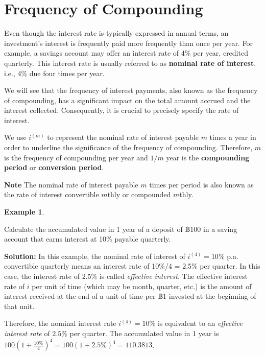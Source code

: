 \documentclass[
]{book}
\theoremstyle{definition}
\theoremstyle{definition}
\newtheorem{example}{Example}[chapter]
\theoremstyle{definition}
\theoremstyle{definition}
\theoremstyle{remark}
\begin{document}
\hypertarget{frequency-of-compounding}{%
\section{Frequency of Compounding}\label{frequency-of-compounding}}

Even though the interest rate is typically expressed in annual terms, an investment's interest is frequently paid more frequently than once per year. For example, a savings account may offer an interest rate of 4\% per year, credited quarterly. This interest rate is usually referred to as \textbf{nominal rate of interest}, i.e., 4\% due four times per year.

We will see that the frequency of interest payments, also known as the frequency of compounding, has a significant impact on the total amount accrued and the interest collected. Consequently, it is crucial to precisely specify the rate of interest.

We use \(i^{(m)}\) to represent the nominal rate of interest payable \(m\) times a year in order to underline the significance of the frequency of compounding. Therefore, \(m\) is the
frequency of compounding per year and \(1/m\) year is the \textbf{compounding period} or \textbf{conversion period}.

\textbf{Note} The nominal rate of interest payable \(m\) times per period is also known as the rate of interest convertible \(m\)thly or compounded \(m\)thly.

\begin{example}
\protect\hypertarget{exm:unlabeled-div-5}{}\label{exm:unlabeled-div-5}

Calculate the accumulated value in 1 year of a deposit of ฿100 in a saving account that earns interest at 10\% payable quarterly.

\end{example}

\textbf{Solution:} In this example, the nominal rate of interest of \(i^{(4)} = 10\%\) p.a. convertible
quarterly means an interest rate of 10\%/4 = 2.5\% per quarter. In this case, the interest rate of 2.5\% is called \emph{effective interest}. The effective interest rate of \(i\) per unit of time (which may be month, quarter, etc.) is the amount of interest received at the end of a unit of time per ฿1 invested at the beginning of that unit.

Therefore, the nominal interest rate \(i^{(4)} = 10\%\) is equivalent to an
\emph{effective interest rate} of \(2.5\%\) per quarter.
The accumulated value in
1 year is \(100 (1 + \frac{10\%}{4})^4 = 100 (1 + 2.5\%)^4 = 110.3813\).
\end{document}

